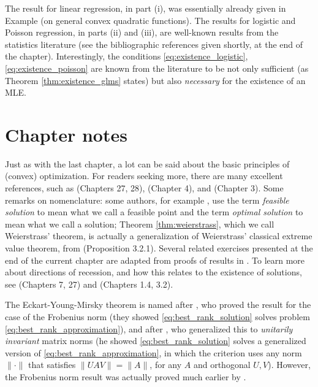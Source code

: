 \begin{Remark}
The result for linear regression, in part (i), was essentially already given in
Example  (on general convex quadratic
functions). The results for logistic and Poisson regression, in parts (ii) and
(iii), are well-known results from the statistics literature (see the
bibliographic references given shortly, at the end of the
chapter). Interestingly, the conditions \eqref{eq:existence_logistic},
\eqref{eq:existence_poisson} are known from the literature to be not only
sufficient (as Theorem \ref{thm:existence_glms} states) but also
\emph{necessary} for the existence of an MLE.       
\end{Remark}

\SkipTocEntry\section*{Chapter notes}

Just as with the last chapter, a lot can be said about the basic principles of
(convex) optimization. For readers seeking more, there are many excellent
references, such as \cite{rockafellar1970convex} (Chapters 27, 28),
\cite{boyd2004convex} (Chapter 4), and \cite{bertsekas2009convex} (Chapter 3).
Some remarks on nomenclature: some authors, for example
\cite{rockafellar1970convex, bertsekas2009convex}, use the term \emph{feasible
  solution} to mean what we call a feasible point and the term \emph{optimal
  solution} to mean what we call a solution; Theorem \ref{thm:weierstrass},
which we call Weierstrass' theorem, is actually a generalization of Weierstrass' 
classical extreme value theorem, from \cite{bertsekas2009convex} (Proposition 
3.2.1). Several related exercises presented at the end of the current chapter
are adapted from proofs of results in \cite{bertsekas2009convex}. To learn more 
about directions of recession, and how this relates to the existence of
solutions, see \cite{rockafellar1970convex} (Chapters 7, 27) and
\cite{bertsekas2009convex} (Chapters 1.4, 3.2).

The Eckart-Young-Mirsky theorem is named after \cite{eckart1936approximation},
who proved the result for the case of the Frobenius norm (they showed
\eqref{eq:best_rank_solution} solves problem
\eqref{eq:best_rank_approximation}), and after \cite{mirsky1960symmetric}, who
generalized this to \emph{unitarily invariant} matrix norms (he showed
\eqref{eq:best_rank_solution} solves a generalized version of
\eqref{eq:best_rank_approximation}, in which the criterion uses any norm  
$\|\cdot\|$ that satisfies $\|U A V\| = \|A\|$, for any $A$ and orthogonal
$U,V$). However, the Frobenius norm result was actually proved much earlier by  
\cite{schmidt1907theorie}. 

